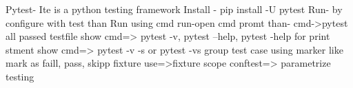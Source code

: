 Pytest- Ite is a python testing framework
Install - pip install -U pytest
Run- by configure with test than Run
using cmd run-open cmd promt than- cmd->pytest
all passed testfile show cmd=> pytest -v, pytest --help, pytest -help
for print stment show cmd=> pytest -v -s or pytest -vs
group test case using marker like mark as faill, pass, skipp
fixture use=>fixture scope
conftest=>
parametrize testing

